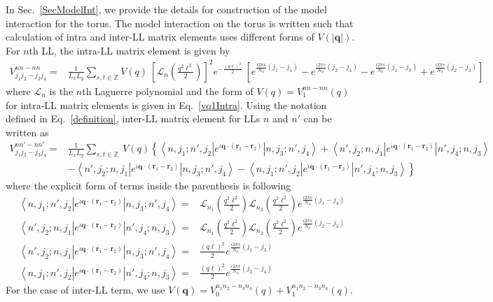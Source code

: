 \documentclass[prb,aps,epsfig,longbibliography,twocolumn]{revtex4-1}
\newcommand{\ket}[1]{\left|#1\right\rangle }
\newcommand{\bra}[1]{\left\langle #1\right|}
\newcommand{\bsym}[1]{\boldsymbol{#1}}
\newcommand{\rbkt}[1]{\left( #1\right)}
\newcommand{\sbkt}[1]{\left[ #1\right]}
\newcommand{\np}{N_{\phi}}
\newcommand{\iiota}{\dot{\iota}}
\begin{document}
In Sec.~\ref{SecModelInt}, we provide the details for construction of the model interaction for the torus. The model interaction on the torus is written such that calculation of intra and inter-LL matrix elements uses different forms of $V(|\bsym{q}|)$. For $n$th LL, the intra-LL matrix element is given by
\begin{align}
V^{nn-nn}_{j_1 j_2-j_3 j_4}=& \frac{1}{L_x L_y} \sum_{s,t \in \mathbb{Z}} V(q)\ \sbkt{\mathcal{L}_n\rbkt{\frac{q^2\ell^2}{2}}}^{2}   e^{- \frac{\rbkt{q\ell}^2}{2}}\ \sbkt{  e^{\frac{{\iiota} 2\pi s}{\np} \rbkt{j_1 - j_4}}  -  e^{\frac{{\iiota} 2\pi s}{\np} \rbkt{j_2 - j_4}}  -     e^{\frac{{\iiota} 2\pi s}{\np} \rbkt{j_1 - j_3}}  +   e^{\frac{{\iiota} 2\pi s}{\np} \rbkt{j_2 - j_3}} } \label{A4}
\end{align}
where $\mathcal{L}_n$ is the $n$th Laguerre polynomial and the form of $V(q)=V_1^{nn-nn}(q)$ for intra-LL matrix elements is given in Eq.~\eqref{vq1Intra}.  Using the notation defined in Eq.~\eqref{definition}, inter-LL matrix element for LLs $n$ and $n'$ can be written as
\begin{align}
V^{n n'-n n'}_{j_1 j_2-j_3 j_4} =&  \frac{1}{L_x L_y} \sum_{s,t\in \mathbb{Z}}\ V({q}) \left\{ \bra{n,j_1;n',j_2}{e^{{\iiota} \bsym{q}\cdot (\bsym{r}_1-\bsym{r}_2)}}\ket{n,j_3;n',j_4} + \bra{n',j_2; n,j_1}{e^{{\iiota} \bsym{q}\cdot (\bsym{r}_1-\bsym{r}_2)}}\ket{n',j_4; n,j_3}  
\right.  \nonumber\\        
& \left.   - \bra{n',j_2;n,j_1}{e^{{\iiota} \bsym{q}\cdot (\bsym{r}_1-\bsym{r}_2)}}\ket{n,j_3;n',j_4} - \bra{n,j_1;n',j_2 }{e^{{\iiota} \bsym{q}\cdot (\bsym{r}_1-\bsym{r}_2)}}\ket{n',j_4; n,j_3}  
     \right\}  \label{interLL}
\end{align}
where the explicit form of terms inside the parenthesis  is following
\begin{align}
	\bra{n,j_1;n',j_2}{e^{{\iiota} \bsym{q}\cdot (\bsym{r}_1-\bsym{r}_2)}}\ket{n,j_3;n',j_4}=&  {\mathcal{L}_{n_1}\rbkt{\frac{q^2\ell^2}{2}} \mathcal{L}_{n_2}\rbkt{\frac{q^2\ell^2}{2}}} e^{\frac{{\iiota} 2\pi s}{\np} \rbkt{j_1 - j_4}} \nonumber \\
	\bra{n',j_2;n,j_1}{e^{{\iiota} \bsym{q}\cdot (\bsym{r}_1-\bsym{r}_2)}}\ket{n',j_4;n,j_3}=&  {\mathcal{L}_{n_1}\rbkt{\frac{q^2\ell^2}{2}} \mathcal{L}_{n_2}\rbkt{\frac{q^2\ell^2}{2}}} e^{\frac{{\iiota} 2\pi s}{\np} \rbkt{j_2 - j_3}} \nonumber \\
	\bra{n',j_2;n,j_1}{e^{{\iiota} \bsym{q}\cdot (\bsym{r}_1-\bsym{r}_2)}}\ket{n,j_3;n',j_4}=&  {\frac{\rbkt{q\ell}^{2}}{2}} e^{\frac{{\iiota} 2\pi s}{\np} \rbkt{j_1 - j_3}} \nonumber \\
	\bra{n,j_1;n',j_2}{e^{{\iiota} \bsym{q}\cdot (\bsym{r}_1-\bsym{r}_2)}}\ket{n',j_4; n,j_3}=& {\frac{\rbkt{q\ell}^{2}}{2}} e^{\frac{{\iiota} 2\pi s}{\np} \rbkt{j_2 - j_4}}
\end{align}
For the case of inter-LL term, we use $V(\bsym{q})=V^{n_1n_2-n_3n_4}_0(q)+V^{n_1n_2-n_3n_4}_1(q)$. 
\end{document}
